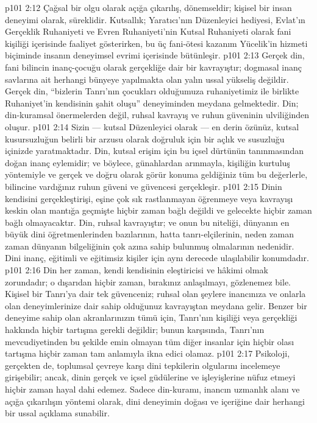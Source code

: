 \vs p101 2:12 Çağsal bir olgu olarak açığa çıkarılış, dönemseldir; kişisel bir insan deneyimi olarak, süreklidir. Kutsallık; Yaratıcı’nın Düzenleyici hediyesi, Evlat’ın Gerçeklik Ruhaniyeti ve Evren Ruhaniyeti’nin Kutsal Ruhaniyeti olarak fani kişiliği içerisinde faaliyet gösterirken, bu üç fani\hyp{}ötesi kazanım Yücelik’in hizmeti biçiminde insanın deneyimsel evrimi içerisinde bütünleşir.
\vs p101 2:13 Gerçek din, fani bilincin inanç\hyp{}çocuğu olarak gerçekliğe dair bir kavrayıştır; dogmasal inanç savlarına ait herhangi bünyeye yapılmakta olan yalın ussal yükseliş değildir. Gerçek din, “bizlerin Tanrı’nın çocukları olduğumuza ruhaniyetimiz ile birlikte Ruhaniyet’in kendisinin şahit oluşu” deneyiminden meydana gelmektedir. Din; din\hyp{}kuramsal önermelerden değil, ruhsal kavrayış ve ruhun güveninin ulviliğinden oluşur.
\vs p101 2:14 Sizin --- kutsal Düzenleyici olarak --- en derin özünüz, kutsal kusursuzluğun belirli bir arzusu olarak doğruluk için bir açlık ve susuzluğu içinizde yaratmaktadır. Din, kutsal erişim için bu içsel dürtünün tanınmasından doğan inanç eylemidir; ve böylece, günahlardan arınmayla, kişiliğin kurtuluş yöntemiyle ve gerçek ve doğru olarak görür konuma geldiğiniz tüm bu değerlerle, bilincine vardığınız ruhun güveni ve güvencesi gerçekleşir.
\vs p101 2:15 Dinin kendisini gerçekleştirişi, eşine çok sık rastlanmayan öğrenmeye veya kavrayışı keskin olan mantığa geçmişte hiçbir zaman bağlı değildi ve gelecekte hiçbir zaman bağlı olmayacaktır. Din, ruhsal kavrayıştır; ve onun bu niteliği, dünyanın en büyük dini öğretmenlerinden bazılarının, hatta tanrı\hyp{}elçilerinin, neden zaman zaman dünyanın bilgeliğinin çok azına sahip bulunmuş olmalarının nedenidir. Dini inanç, eğitimli ve eğitimsiz kişiler için aynı derecede ulaşılabilir konumdadır.
\vs p101 2:16 Din her zaman, kendi kendisinin eleştiricisi ve hâkimi olmak zorundadır; o dışarıdan hiçbir zaman, bırakınız anlaşılmayı, gözlenemez bile. Kişisel bir Tanrı’ya dair tek güvenceniz; ruhsal olan şeylere inancınıza ve onlarla olan deneyimlerinize dair sahip olduğunuz kavrayıştan meydana gelir. Benzer bir deneyime sahip olan akranlarınızın tümü için, Tanrı’nın kişiliği veya gerçekliği hakkında hiçbir tartışma gerekli değildir; bunun karşısında, Tanrı’nın mevcudiyetinden bu şekilde emin olmayan tüm diğer insanlar için hiçbir olası tartışma hiçbir zaman tam anlamıyla ikna edici olamaz.
\vs p101 2:17 Psikoloji, gerçekten de, toplumsal çevreye karşı dini tepkilerin olgularını incelemeye girişebilir; ancak, dinin gerçek ve içsel güdülerine ve işleyişlerine nüfuz etmeyi hiçbir zaman hayal dahi edemez. Sadece din\hyp{}kuramı, inancın uzmanlık alanı ve açığa çıkarılışın yöntemi olarak, dini deneyimin doğası ve içeriğine dair herhangi bir ussal açıklama sunabilir.
